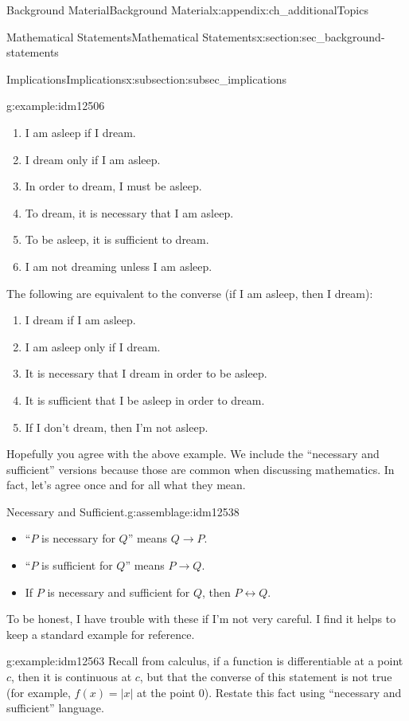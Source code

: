 \documentclass[oneside,10pt,]{book}
\numberwithin{equation}{chapter}
\def\iff{\leftrightarrow}
\def\imp{\rightarrow}
\begin{document}
\begin{appendixptx}{Background Material}{}{Background Material}{}{}{x:appendix:ch_additionalTopics}
\begin{sectionptx}{Mathematical Statements}{}{Mathematical Statements}{}{}{x:section:sec_background-statements}
\begin{subsectionptx}{Implications}{}{Implications}{}{}{x:subsection:subsec_implications}
\begin{example}{}{g:example:idm12506}
\begin{enumerate}
\item{}I am asleep if I dream.%
\item{}I dream only if I am asleep.%
\item{}In order to dream, I must be asleep.%
\item{}To dream, it is necessary that I am asleep.%
\item{}To be asleep, it is sufficient to dream.%
\item{}I am not dreaming unless I am asleep.%
\end{enumerate}
The following are equivalent to the converse (if I am asleep, then I dream):%
\begin{enumerate}
\item{}I dream if I am asleep.%
\item{}I am asleep only if I dream.%
\item{}It is necessary that I dream in order to be asleep.%
\item{}It is sufficient that I be asleep in order to dream.%
\item{}If I don't dream, then I'm not asleep.%
\end{enumerate}
%
\end{example}
Hopefully you agree with the above example. We include the ``necessary and sufficient'' versions because those are common when discussing mathematics. In fact, let's agree once and for all what they mean.%
\begin{assemblage}{Necessary and Sufficient.}{g:assemblage:idm12538}%
\par
%
\begin{itemize}[label=\textbullet]
\item{}``\(P\) is necessary for \(Q\)'' means \(Q \imp P\).%
\item{}``\(P\) is sufficient for \(Q\)'' means \(P \imp Q\).%
\item{}If \(P\) is necessary and sufficient for \(Q\), then \(P \iff Q\).%
\end{itemize}
%
\end{assemblage}
To be honest, I have trouble with these if I'm not very careful. I find it helps to keep a standard example for reference.%
\begin{example}{}{g:example:idm12563}%
Recall from calculus, if a function is differentiable at a point \(c\), then it is continuous at \(c\), but that the converse of this statement is not true (for example, \(f(x) = |x|\) at the point 0). Restate this fact using ``necessary and sufficient'' language.%

\end{example}
\end{subsectionptx}
\end{sectionptx}
\end{appendixptx}
\end{document}
